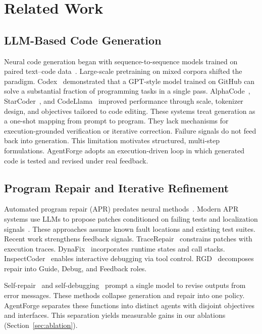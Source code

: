 \documentclass[journal]{IEEEtran}
\begin{document}
\section{Related Work}
\label{sec:related}

\subsection{LLM-Based Code Generation}

Neural code generation began with sequence-to-sequence models trained on paired text--code data~\cite{iyer2016summarizing,yin2017syntactic}. Large-scale pretraining on mixed corpora shifted the paradigm. Codex~\cite{chen2021codex} demonstrated that a GPT-style model trained on GitHub can solve a substantial fraction of programming tasks in a single pass. AlphaCode~\cite{li2022alphacode}, StarCoder~\cite{li2023starcoder}, and CodeLlama~\cite{roziere2023codellama} improved performance through scale, tokenizer design, and objectives tailored to code editing. These systems treat generation as a one-shot mapping from prompt to program. They lack mechanisms for execution-grounded verification or iterative correction. Failure signals do not feed back into generation. This limitation motivates structured, multi-step formulations. AgentForge adopts an execution-driven loop in which generated code is tested and revised under real feedback.

\subsection{Program Repair and Iterative Refinement}

Automated program repair (APR) predates neural methods~\cite{le2012genprog}. Modern APR systems use LLMs to propose patches conditioned on failing tests and localization signals~\cite{xia2022less,jin2023inferfix,fan2023automated}. These approaches assume known fault locations and existing test suites. Recent work strengthens feedback signals. TraceRepair~\cite{tracerepair2026} constrains patches with execution traces. DynaFix~\cite{dynafix2025} incorporates runtime states and call stacks. InspectCoder~\cite{inspectcoder2025} enables interactive debugging via tool control. RGD~\cite{rgd2024} decomposes repair into Guide, Debug, and Feedback roles.

Self-repair~\cite{olausson2023selfrepair} and self-debugging~\cite{chen2023teaching} prompt a single model to revise outputs from error messages. These methods collapse generation and repair into one policy. AgentForge separates these functions into distinct agents with disjoint objectives and interfaces. This separation yields measurable gains in our ablations (Section~\ref{sec:ablation}).
\end{document}
